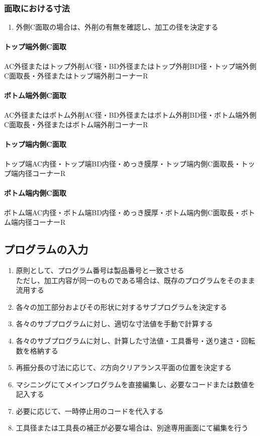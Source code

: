\subsubsection{面取における寸法}
\begin{enumerate}
\item 外側C面取の場合は、外削の有無を確認し、加工の径を決定する
\end{enumerate}
\begin{Tabbox}[title={必要な図面上のパラメータ}]\small
\paragraph*{トップ端外側C面取}
AC外径またはトップ外削AC径・BD外径またはトップ外削BD径・トップ端外側C面取長・外径またはトップ端外削コーナーR
\tcbline*
\paragraph*{ボトム端外側C面取}
AC外径またはボトム外削AC径・BD外径またはボトム外削BD径・ボトム端外側C面取長・外径またはボトム端外削コーナーR
\tcbline*
\paragraph*{トップ端内側C面取}
トップ端AC内径・トップ端BD内径・めっき膜厚・トップ端内側C面取長・トップ端内径コーナーR
\tcbline*
\paragraph*{ボトム端内側C面取}
ボトム端AC内径・ボトム端BD内径・めっき膜厚・ボトム端内側C面取長・ボトム端内径コーナーR
\end{Tabbox}


\clearpage
\subsection{プログラムの入力}
\begin{enumerate}
\item 原則として、プログラム番号は製品番号と一致させる\\
ただし、加工内容が同一のものである場合は、既存のプログラムをそのまま流用する
\item 各々の加工部分およびその形状に対するサブプログラムを決定する
\item 各々のサブプログラムに対し、適切な寸法値を手動で計算する
\item 各々のサブプログラムに対し、計算した寸法値・工具番号・送り速さ・回転数を格納する
\item 再振分長の寸法に応じて、$Z$方向クリアランス平面の位置を決定する
\item マシニングにてメインプログラムを直接編集し、必要なコードまたは数値を記入する
\item 必要に応じて、一時停止用のコードを代入する
\item 工具径または工具長の補正が必要な場合は、別途専用画面にて編集を行う
\end{enumerate}



